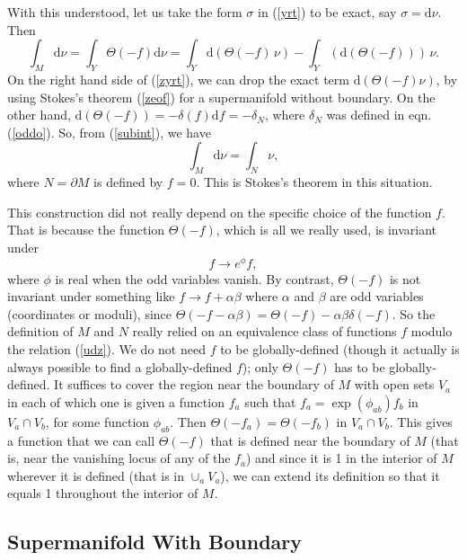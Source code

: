 \documentclass[11pt,a4paper]{article}
\def\d{{\mathrm d}}
\begin{document}
With this understood, let us take the form $\sigma$ in (\ref{yrt}) to be exact, say $\sigma=\d\nu$.  Then
\begin{equation}\label{zyrt}\int_M\d\nu=\int_Y\Theta(-f)\d\nu=\int_Y\d(\Theta(-f)\,\nu)-\int_Y(\d(\Theta(-f)))\,\nu.\end{equation}
On the right hand side of (\ref{zyrt}), we can drop the exact term $\d(\Theta(-f)\nu)$, by using Stokes's theorem (\ref{zeof}) for a supermanifold without boundary.
On the other hand, $\d(\Theta(-f))=-\delta(f)\d f=-\delta_N$, where $\delta_N$ was defined in eqn. (\ref{oddo}).    So, from (\ref{subint}),
we have
\begin{equation}\label{myrt}\int_M\d\nu=\int_N \nu,\end{equation}
where $N=\partial M$ is defined by $f=0$.    This is Stokes's theorem in this situation.

This construction did not really depend on the specific choice of the function $f$.  That is because the function $\Theta(-f)$, which is all we really used, is invariant under
\begin{equation}\label{udz} f\to e^\phi f,\end{equation}
where $\phi$ is real when the odd variables vanish.  By contrast, $\Theta(-f)$ is not invariant under something like $f\to f+\alpha\beta$ where $\alpha$ and $\beta$
are odd variables (coordinates or moduli), since  $\Theta(-f-\alpha\beta)=\Theta(-f)-\alpha\beta\delta(-f)$.  So the definition of $M$ and $N$ really relied on an equivalence
class of functions $f$ modulo the relation (\ref{udz}).  We do not need $f$ to be globally-defined (though it actually is always possible to find a globally-defined $f$); 
only $\Theta(-f)$ has to be globally-defined.  It suffices to cover the
region  near the boundary of $M$ with open sets $V_a$ in each of which one is given a function $f_a$ such that 
$f_a=\exp(\phi_{ab})f_b$ in $V_a \cap V_b$, for some function $\phi_{ab}$.  Then $\Theta(-f_a)=\Theta(-f_b)$ in $V_a\cap V_b$.  This gives a function that we can call $\Theta(-f)$ that is defined
near the boundary of $M$ (that is, near the vanishing locus of any of the $f_a$) and since it is 1 in the interior of $M$ wherever it is defined (that is in $\cup_aV_a$), we can extend its definition so that it
equals 1 throughout the interior of $M$.

\subsection{Supermanifold With Boundary}\label{urtz}
\end{document}
